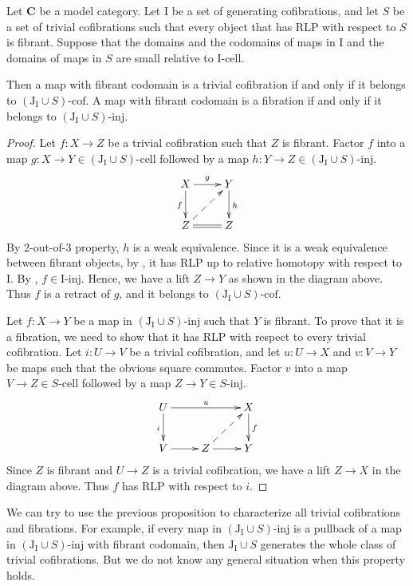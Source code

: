 \documentclass{tac}
\theoremstyle{definition}
\newcommand{\cat}[1]{\mathbf{#1}}
\newcommand{\C}{\cat{C}}
\newcommand{\I}{\mathrm{I}}
\newcommand{\J}{\mathrm{J}}
\newcommand{\class}[2]{#1\text{-}\mathrm{#2}}
\newcommand{\Iinj}[1][\I]{\class{#1}{inj}}
\newcommand{\Icell}[1][\I]{\class{#1}{cell}}
\newcommand{\Icof}[1][\I]{\class{#1}{cof}}
\begin{document}
\begin{prop}
Let $\C$ be a model category.
Let $\I$ be a set of generating cofibrations, and let $S$ be a set of trivial cofibrations
such that every object that has RLP with respect to $S$ is fibrant.
Suppose that the domains and the codomains of maps in $\I$ and the domains of maps in $S$ are small relative to $\Icell$.

Then a map with fibrant codomain is a trivial cofibration if and only if it belongs to $\Icof[(\J_\I \cup S)]$.
A map with fibrant codomain is a fibration if and only if it belongs to $\Iinj[(\J_\I \cup S)]$.
\end{prop}
\begin{proof}
Let $f : X \to Z$ be a trivial cofibration such that $Z$ is fibrant.
Factor $f$ into a map $g : X \to Y \in \Icell[(\J_\I \cup S)]$ followed by a map $h : Y \to Z \in \Iinj[(\J_\I \cup S)]$.
\[ \xymatrix{ X \ar[r]^g \ar[d]_f & Y \ar[d]^h \\
              Z \ar@{=}[r] \ar@{-->}[ur] & Z
            } \]
By 2-out-of-3 property, $h$ is a weak equivalence.
Since it is a weak equivalence between fibrant objects, by , it has RLP up to relative homotopy with respect to $\I$.
By , $f \in \Iinj$.
Hence, we have a lift $Z \to Y$ as shown in the diagram above.
Thus $f$ is a retract of $g$, and it belongs to $\Icof[(\J_\I \cup S)]$.

Let $f : X \to Y$ be a map in $\Iinj[(\J_\I \cup S)]$ such that $Y$ is fibrant.
To prove that it is a fibration, we need to show that it has RLP with respect to every trivial cofibration.
Let $i : U \to V$ be a trivial cofibration, and let $u : U \to X$ and $v : V \to Y$ be maps such that the obvious square commutes.
Factor $v$ into a map $V \to Z \in \Icell[S]$ followed by a map $Z \to Y \in \Iinj[S]$.
\[ \xymatrix{ U \ar[rr]^u \ar[d]_i & & X \ar[d]^f \\
              V \ar[r] & Z \ar[r] \ar@{-->}[ur] & Y
            } \]
Since $Z$ is fibrant and $U \to Z$ is a trivial cofibration, we have a lift $Z \to X$ in the diagram above.
Thus $f$ has RLP with respect to $i$.
\end{proof}

We can try to use the previous proposition to characterize all trivial cofibrations and fibrations.
For example, if every map in $\Iinj[(\J_\I \cup S)]$ is a pullback of a map in $\Iinj[(\J_\I \cup S)]$ with fibrant codomain,
then $\J_\I \cup S$ generates the whole class of trivial cofibrations.
But we do not know any general situation when this property holds.
\end{document}

